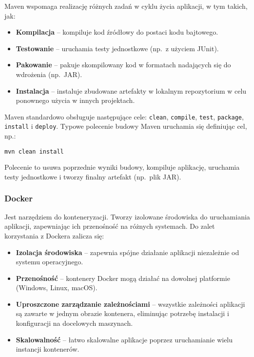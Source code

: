 \noindent Maven wspomaga realizację różnych zadań w cyklu życia aplikacji, w tym takich, jak: 
\begin{itemize} %
    \item \textbf{Kompilacja} -- kompiluje kod źródłowy do postaci kodu bajtowego.
    \item \textbf{Testowanie} -- uruchamia testy jednostkowe (np.\ z użyciem JUnit).
    \item \textbf{Pakowanie} -- pakuje skompilowany kod w formatach nadających się do wdrożenia (np.\ JAR).
    \item \textbf{Instalacja} -- instaluje zbudowane artefakty w lokalnym repozytorium w celu ponownego użycia w innych projektach.
\end{itemize}

\noindent Maven standardowo obsługuje następujące cele: \texttt{clean}, \texttt{compile}, \texttt{test}, \texttt{package}, \texttt{install} i \texttt{deploy}. Typowe polecenie budowy Maven uruchamia się definiując cel, np.:
\begin{lstlisting}
mvn clean install
\end{lstlisting}
Polecenie to usuwa poprzednie wyniki budowy, kompiluje aplikację, uruchamia testy jednostkowe i tworzy finalny artefakt (np.\ plik JAR).

\subsubsection{Docker} 
Jest narzędziem do konteneryzacji. Tworzy izolowane środowiska do uruchamiania aplikacji, zapewniając ich przenośność na różnych systemach. Do zalet korzystania z Dockera zalicza się:
\begin{itemize} 
    \item \textbf{Izolacja środowiska} -- zapewnia spójne działanie aplikacji niezależnie od systemu operacyjnego.
    \item \textbf{Przenośność} -- kontenery Docker mogą działać na dowolnej platformie (Windows, Linux, macOS).
    \item \textbf{Uproszczone zarządzanie zależnościami} -- wszystkie zależności aplikacji są zawarte w jednym obrazie kontenera, eliminując potrzebę instalacji i konfiguracji na docelowych maszynach.
    \item \textbf{Skalowalność} -- łatwo skalowalne aplikacje poprzez uruchamianie wielu instancji kontenerów.
\end{itemize}

